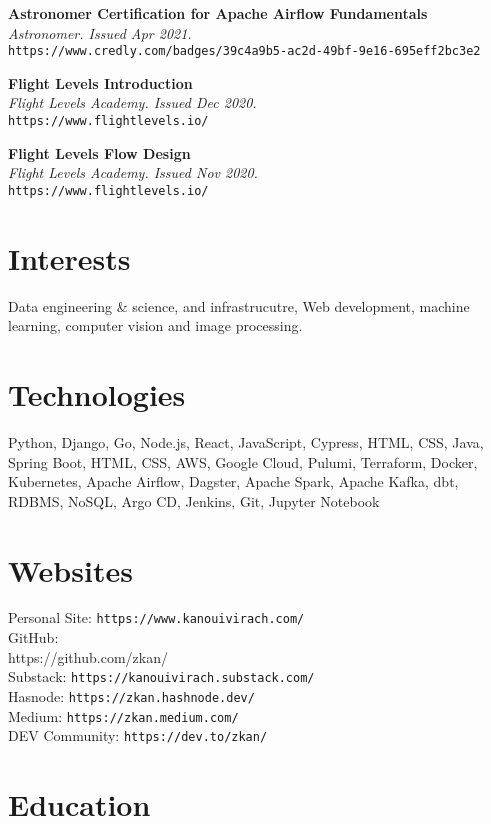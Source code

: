 \documentclass[margin, 10pt]{res}
\begin{document}
\begin{resume}
{\bf Astronomer Certification for Apache Airflow Fundamentals}\\
{\it \small Astronomer. Issued Apr 2021.}\\
{\tt https://www.credly.com/badges/39c4a9b5-ac2d-49bf-9e16-695eff2bc3e2}

{\bf Flight Levels Introduction}\\
{\it \small Flight Levels Academy. Issued Dec 2020.}\\
{\tt https://www.flightlevels.io/}

{\bf Flight Levels Flow Design}\\
{\it \small Flight Levels Academy. Issued Nov 2020.}\\
{\tt https://www.flightlevels.io/}

\section{Interests}

Data engineering \& science, and infrastrucutre, Web development,
machine learning, computer vision and image processing.

\section{Technologies}

Python, Django, Go, Node.js, React, JavaScript, Cypress, HTML, CSS, Java,
Spring Boot, HTML, CSS, AWS, Google Cloud, Pulumi, Terraform, Docker,
Kubernetes, Apache Airflow, Dagster, Apache Spark, Apache Kafka, dbt, RDBMS,
NoSQL, Argo CD, Jenkins, Git, Jupyter Notebook

\section{Websites}

Personal Site: {\tt https://www.kanouivirach.com/}\\
GitHub: {\\ https://github.com/zkan/}\\
Substack: {\tt https://kanouivirach.substack.com/}\\
Hasnode: {\tt https://zkan.hashnode.dev/}\\
Medium: {\tt https://zkan.medium.com/}\\
DEV Community: {\tt https://dev.to/zkan/}\\

\section{Education}


\end{resume}
\end{document}
